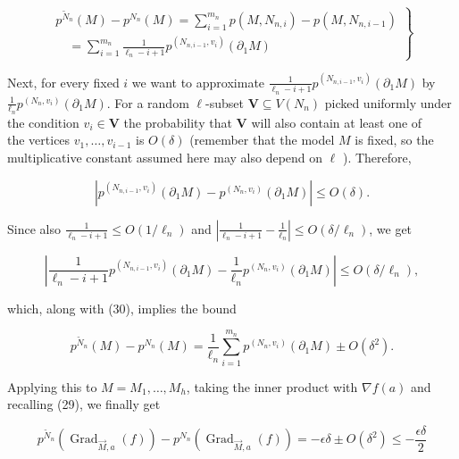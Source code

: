 \documentclass[10pt]{article}
\begin{document}
\[
\left.\begin{array}{l}
p^{\widetilde{N}_{n}}(M)-p^{N_{n}}(M)=\sum_{i=1}^{m_{n}} p\left(M, N_{n, i}\right)-p\left(M, N_{n, i-1}\right)  \tag{30}\\
\quad=\sum_{i=1}^{m_{n}} \frac{1}{\ell_{n}-i+1} p^{\left(N_{n, i-1}, v_{i}\right)}\left(\partial_{1} M\right)
\end{array}\right\}
\]

Next, for every fixed $i$ we want to approximate $\frac{1}{\ell_{n}-i+1} p^{\left(N_{n, i-1}, v_{i}\right)}\left(\partial_{1} M\right)$ by $\frac{1}{\ell_{n}} p^{\left(N_{n}, v_{i}\right)}\left(\partial_{1} M\right)$. For a random $\ell$-subset $\boldsymbol{V} \subseteq V\left(N_{n}\right)$ picked uniformly under the condition $v_{i} \in \boldsymbol{V}$ the probability that $\boldsymbol{V}$ will also contain at least one of\\
the vertices $v_{1}, \ldots, v_{i-1}$ is $O(\delta)$ (remember that the model $M$ is fixed, so the multiplicative constant assumed here may also depend on $\ell$ ). Therefore,


\begin{equation*}
\left|p^{\left(N_{n, i-1}, v_{i}\right)}\left(\partial_{1} M\right)-p^{\left(N_{n}, v_{i}\right)}\left(\partial_{1} M\right)\right| \leq O(\delta) . \tag{31}
\end{equation*}


Since also $\frac{1}{\ell_{n}-i+1} \leq O\left(1 / \ell_{n}\right)$ and $\left|\frac{1}{\ell_{n}-i+1}-\frac{1}{\ell_{n}}\right| \leq O\left(\delta / \ell_{n}\right)$, we get

$$
\left|\frac{1}{\ell_{n}-i+1} p^{\left(N_{n, i-1}, v_{i}\right)}\left(\partial_{1} M\right)-\frac{1}{\ell_{n}} p^{\left(N_{n}, v_{i}\right)}\left(\partial_{1} M\right)\right| \leq O\left(\delta / \ell_{n}\right),
$$

which, along with (30), implies the bound


\begin{equation*}
p^{\tilde{N}_{n}}(M)-p^{N_{n}}(M)=\frac{1}{\ell_{n}} \sum_{i=1}^{m_{n}} p^{\left(N_{n}, v_{i}\right)}\left(\partial_{1} M\right) \pm O\left(\delta^{2}\right) . \tag{32}
\end{equation*}


Applying this to $M=M_{1}, \ldots, M_{h}$, taking the inner product with $\nabla f(a)$ and recalling (29), we finally get


\begin{equation*}
p^{\tilde{N}_{n}}\left(\operatorname{Grad}_{\vec{M}, a}(f)\right)-p^{N_{n}}\left(\operatorname{Grad}_{\vec{M}, a}(f)\right)=-\epsilon \delta \pm O\left(\delta^{2}\right) \leq-\frac{\epsilon \delta}{2} \tag{33}
\end{equation*}
\end{document}
